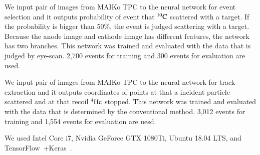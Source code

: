 \documentclass{jps-cp}
\begin{document}
We input pair of images from MAIKo TPC to the neural network for event selection and
it outputs probability of event that ${}^{10}\rm{C}$ scattered with a target.
If the probability is bigger than 50\%, the event is judged scattering with a target.
Because the anode image and cathode image has different features,
the network has two branches.
This network was trained and evaluated with the data that is judged by eye-scan.
2,700 events for training and 300 events for evaluation are used.

We input pair of images from MAIKo TPC to the neural network for track extraction and
it outputs coordinates of points at that a incident particle scattered and at that recoil ${}^{4}\rm{He}$ stopped.
This network was trained and evaluated with the data that is determined by the conventional method.
3,012 events for training and 1,554 events for evaluation are uesd.

We used Intel Core i7, Nvidia GeForce GTX 1080Ti, Ubuntu 18.04 LTS, and
TensorFlow~\cite{tensorflow}+Keras~\cite{keras}.
\end{document}
